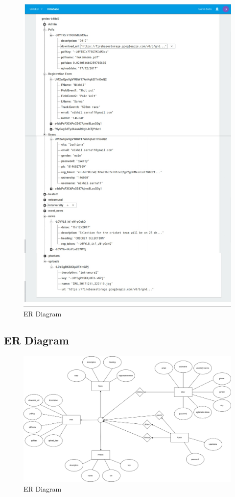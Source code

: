\newpage	
	\begin{figure}[ht]
		\centering
		\includegraphics[scale=0.20]{images/dbfire.jpg}
		\caption{ER Diagram}
	\end{figure}

	\subsection{ER Diagram}
	
\newpage	
	\begin{figure}[ht]
		\centering
		\includegraphics[scale=0.35]{images/ergndec.png}
		\caption{ER Diagram}
	\end{figure}
	
